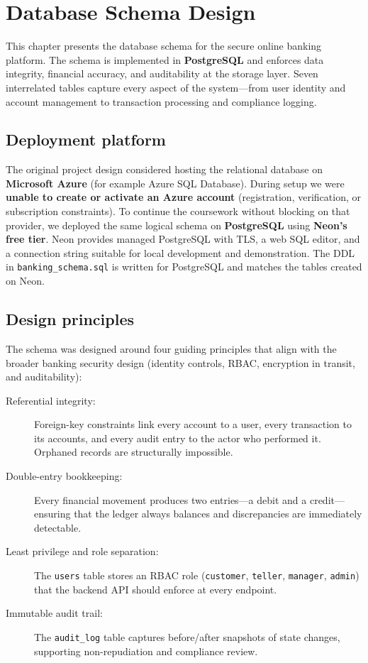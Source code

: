 \chapter{Database Schema Design}
\label{ch:db-schema}

This chapter presents the database schema for the secure online banking platform. The schema is implemented in \textbf{PostgreSQL} and enforces data integrity, financial accuracy, and auditability at the storage layer. Seven interrelated tables capture every aspect of the system---from user identity and account management to transaction processing and compliance logging.

\section{Deployment platform}

The original project design considered hosting the relational database on \textbf{Microsoft Azure} (for example Azure SQL Database). During setup we were \textbf{unable to create or activate an Azure account} (registration, verification, or subscription constraints). To continue the coursework without blocking on that provider, we deployed the same logical schema on \textbf{PostgreSQL} using \textbf{Neon's free tier}. Neon provides managed PostgreSQL with TLS, a web SQL editor, and a connection string suitable for local development and demonstration. The DDL in \texttt{banking\_schema.sql} is written for PostgreSQL and matches the tables created on Neon.

\section{Design principles}

The schema was designed around four guiding principles that align with the broader banking security design (identity controls, RBAC, encryption in transit, and auditability):

\begin{description}
  \item[Referential integrity:]
    Foreign-key constraints link every account to a user, every transaction to its accounts, and every audit entry to the actor who performed it. Orphaned records are structurally impossible.
  \item[Double-entry bookkeeping:]
    Every financial movement produces two entries---a debit and a credit---ensuring that the ledger always balances and discrepancies are immediately detectable.
  \item[Least privilege and role separation:]
    The \texttt{users} table stores an RBAC role (\texttt{customer}, \texttt{teller}, \texttt{manager}, \texttt{admin}) that the backend API should enforce at every endpoint.
  \item[Immutable audit trail:]
    The \texttt{audit\_log} table captures before/after snapshots of state changes, supporting non-repudiation and compliance review.
\end{description}

